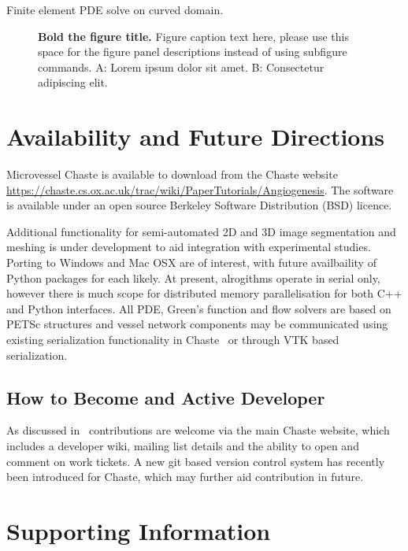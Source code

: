 \documentclass[10pt,letterpaper]{article}
\begin{document}
Finite element PDE solve on curved domain.

\begin{figure}[!h]
\caption{{\bf Bold the figure title.}
Figure caption text here, please use this space for the figure panel descriptions instead of using subfigure commands. A: Lorem ipsum dolor sit amet. B: Consectetur adipiscing elit.}
\label{fig1}
\end{figure}


\section*{Availability and Future Directions}

Microvessel Chaste is available to download from the Chaste website  \url{https://chaste.cs.ox.ac.uk/trac/wiki/PaperTutorials/Angiogenesis}. The software is available under an open source Berkeley Software Distribution (BSD) licence. 

Additional functionality for semi-automated 2D and 3D image segmentation and meshing is under development to aid integration with experimental studies. Porting to Windows and Mac OSX are of interest, with future availbaility of Python packages for each likely. At present, alrogithms operate in serial only, however there is much scope for distributed memory parallelisation for both C++ and Python interfaces. All PDE, Green's function and flow solvers are based on PETSc structures and vessel network components may be communicated using existing serialization functionality in Chaste~\cite{Harvey} or through VTK based serialization.

\subsection*{How to Become and Active Developer}

As discussed in~\cite{Mirams2013} contributions are welcome via the main Chaste website, which includes a developer wiki, mailing list details and the ability to open and comment on work tickets. A new git based version control system has recently been introduced for Chaste, which may further aid contribution in future.


\section*{Supporting Information}

\end{document}
